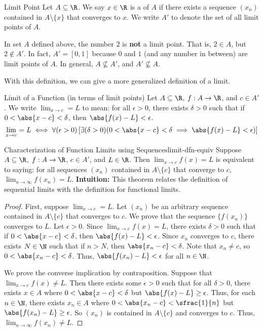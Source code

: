 \begin{dfnbox}{Limit Point}{}
    Let $A \subseteq \R$. We say $x \in \R$ is a  of $A$ if there exists a sequence $(x_n)$ contained in $A \setminus \{x\}$ that converges to $x$. We write $A\prime$ to denote the set of all limit points of $A$.
\end{dfnbox}

In set $A$ defined above, the number $2$ is \textbf{not} a limit point. That is, $2 \in A$, but $2 \notin A\prime$. In fact, $A\prime = [0,1]$ because $0$ and $1$ (and any number in between) are limit points of $A$. In general, $A \not \subseteq A\prime$, and $A\prime \not\subseteq A$.

With this definition, we can give a more generalized definition of a limit.
\begin{dfnbox}{Limit of a Function (in terms of limit points)}{}
    Let $A \subseteq \R$, $f : A \to \R$, and $c \in A\prime$. We write $\lim_{x \to c} = L$ to mean: for all $\epsilon > 0$, there exists $\delta > 0$ such that if $0 < \abs{x - c} < \delta$, then $\abs{f(x) - L} < \epsilon$.
    \tcblower
    \[ \lim_{x \to c} = L \iff \forall(\epsilon > 0) \left[ \exists(\delta > 0)(0 < \abs{x-c} < \delta \implies \abs{f(x) - L} < \epsilon) \right] \]
\end{dfnbox}

\begin{thmbox}{Characterization of Function Limits using Sequences}{limit-dfn-equiv}
    Suppose $A \subseteq \R$, $f: A \to \R$, $c \in A\prime$, and $L \in \R$. Then $\lim_{x \to c} f(x) = L$ is equivalent to saying: for all sequences $(x_n)$ contained in $A \setminus \{c\}$ that converge to $c$, $\lim_{n \to \infty} f(x_n) = L$.
    \tcblower
    \textbf{Intuition:} This theorem relates the definition of sequential limits with the definition for functional limits.
    \begin{proof}
        First, suppose $\lim_{x \to c} = L$. Let $(x_n)$ be an arbitrary sequence contained in $A \setminus \{c\}$ that converges to $c$. We prove that the sequence $\{ f(x_n) \}$ converges to $L$. Let $\epsilon > 0$. Since $\lim_{x \to c} f(x) = L$, there exists $\delta > 0$ such that if $0 < \abs{x-c} < \delta$, then $\abs{f(x) - L} < \epsilon$. Since $x_n$ converges to $c$, there exists $N \in \N$ such that if $n > N$, then $\abs{x_n - c} < \delta$. Note that $x_n \neq c$, so $0 < \abs{x_n - c} < \delta$. Thus, $\abs{f(x_n) - L} < \epsilon$ for all $n \in \N$.

        We prove the converse implication by contraposition. Suppose that $\lim_{x \to c} f(x) \neq L$. Then there exists some $\epsilon > 0$ such that for all $\delta > 0$, there exists $x \in A$ where $0 < \abs{x-c} < \delta$ but $\abs{f(x) - L} \geq \epsilon$. Thus, for each $n \in \N$, there exists $x_n \in A$ where $0 < \abs{x_n - c} < \sfrac{1}{n}$ but $\abs{f(x_n) - L} \geq \epsilon$. So $(x_n)$ is contained in $A \setminus \{c\}$ and converges to $c$. Thus, $\lim_{n \to \infty} f(x_n) \neq L$.
    \end{proof}
\end{thmbox}

